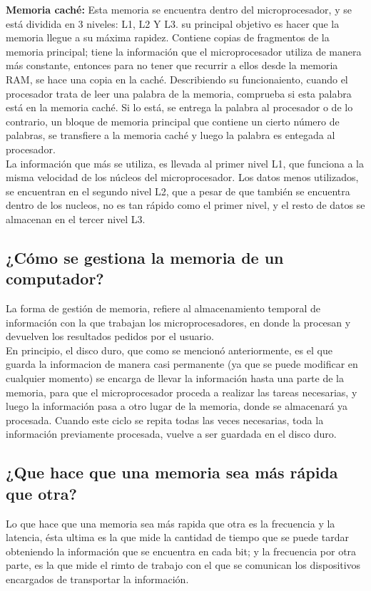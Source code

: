 \documentclass{article}
\begin{document}
\textbf{Memoria caché:} Esta memoria se encuentra dentro del microprocesador, y se está dividida en 3 niveles: L1, L2 Y L3. su principal objetivo es hacer que la memoria llegue a su máxima rapidez. Contiene copias de fragmentos de la memoria principal; tiene la información que el microprocesador utiliza de manera más constante, entonces para no tener que recurrir a ellos desde la memoria RAM, se hace una copia en la caché.  
\noindent
Describiendo su funcionaiento, cuando el procesador trata de leer una palabra de la memoria, comprueba si esta palabra está en la memoria caché. Si lo está, se entrega la palabra al procesador o de lo contrario, un bloque de memoria principal que contiene un cierto número de palabras, se transfiere a la memoria caché y luego la palabra es entegada al procesador.  \\
\noindent
La información que más se utiliza, es llevada al primer nivel L1, que funciona a la misma velocidad de los núcleos del microprocesador. Los datos menos utilizados, se encuentran en el segundo nivel L2, que a pesar de que también se encuentra dentro de los nucleos, no es tan rápido como el primer nivel, y el resto de datos se almacenan en el tercer nivel L3. 
 
\subsection{¿Cómo se gestiona la memoria de un computador?}
%
La forma de gestión de memoria, refiere al almacenamiento temporal de información con la que trabajan los microprocesadores, en donde la procesan y devuelven los resultados pedidos por el usuario.\\
\noindent
En principio, el disco duro, que como se mencionó anteriormente, es el que guarda la informacion de manera casi permanente (ya que se puede modificar en cualquier momento) se encarga de llevar la información hasta una parte de la memoria, para que el microprocesador proceda a realizar las tareas necesarias, y luego la información pasa a otro lugar de la memoria, donde se almacenará ya procesada.
Cuando este ciclo se repita todas las veces necesarias, toda la información previamente procesada, vuelve a ser guardada en el disco duro.

\subsection{¿Que hace que una memoria sea más rápida que otra?}
%
Lo que hace que una memoria sea más rapida que otra es la frecuencia y la latencia, ésta ultima es la que mide la cantidad de tiempo que se puede tardar obteniendo la información que se encuentra en cada bit; y la frecuencia por otra parte, es la que mide el rimto de trabajo con el que se comunican los dispositivos encargados de transportar la información.\\
\end{document}
